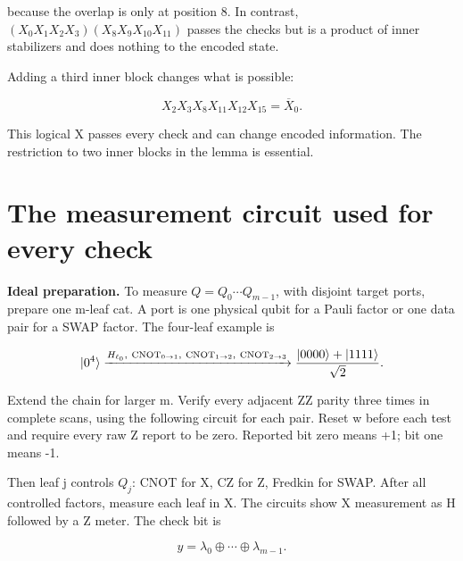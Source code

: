 \documentclass[11pt]{article}
\begin{document}
because the overlap is only at position 8. In contrast, \((X_0X_1X_2X_3)(X_8X_9X_{10}X_{11})\) passes the checks but is a product of inner stabilizers and does nothing to the encoded state.

Adding a third inner block changes what is possible:

\[
X_2X_3X_8X_{11}X_{12}X_{15}=\overline X_0.
\]

This logical X passes every check and can change encoded information. The restriction to two inner blocks in the lemma is essential.

\section{The measurement circuit used for every check}
\textbf{Ideal preparation.} To measure \(Q=Q_0\cdots Q_{m-1}\), with disjoint target ports, prepare one m-leaf cat. A port is one physical qubit for a Pauli factor or one data pair for a SWAP factor. The four-leaf example is

\[
|0^4\rangle\xrightarrow{H_{\ell_0},\ {\rm CNOT}_{0\to1},\ {\rm CNOT}_{1\to2},\ {\rm CNOT}_{2\to3}}
\frac{|0000\rangle+|1111\rangle}{\sqrt2}.
\]

\begin{center}\begin{minipage}{\linewidth}

\end{minipage}\end{center}

Extend the chain for larger m. Verify every adjacent ZZ parity three times in complete scans, using the following circuit for each pair. Reset w before each test and require every raw Z report to be zero. Reported bit zero means +1; bit one means -1.

\begin{center}\begin{minipage}{\linewidth}

\end{minipage}\end{center}

Then leaf j controls \(Q_j\): CNOT for X, CZ for Z, Fredkin for SWAP. After all controlled factors, measure each leaf in X. The circuits show X measurement as H followed by a Z meter. The check bit is

\[
y=\lambda_0\oplus\cdots\oplus\lambda_{m-1}.
\]
\end{document}
